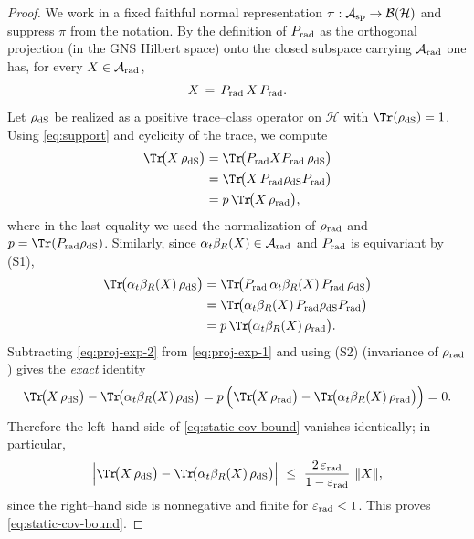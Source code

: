 \documentclass[10pt]{article}
\theoremstyle{definition}
\theoremstyle{plain}
\begin{document}
\begin{proof}
We work in a fixed faithful normal representation $\pi:\mathcal A_{\rm sp}\to\mathcal B(\mathcal H)$ and suppress $\pi$ from the notation.
By the definition of $P_{\rm rad}$ as the orthogonal projection (in the GNS Hilbert space) onto the closed subspace carrying
$\mathcal A_{\rm rad}$ one has, for every $X\in\mathcal A_{\rm rad}$,
\begin{equation}\label{eq:support}
X\,=\,P_{\rm rad}\,X\,P_{\rm rad}.
\end{equation}
Let $\rho_{\rm dS}$ be realized as a positive trace–class operator on $\mathcal H$ with $\Tr(\rho_{\rm dS})=1$.
Using \eqref{eq:support} and cyclicity of the trace, we compute
\begin{equation}
\label{eq:proj-exp-1}
\begin{aligned}
\Tr\!\big(X\,\rho_{\rm dS}\big)
&=\Tr\!\big(P_{\rm rad} X P_{\rm rad}\,\rho_{\rm dS}\big)\\
&=\Tr\!\big(X\,P_{\rm rad}\rho_{\rm dS}P_{\rm rad}\big)\\
&= p\,\Tr\!\big(X\,\rho_{\rm rad}\big),
\end{aligned}
\end{equation}
where in the last equality we used the normalization of $\rho_{\rm rad}$ and $p=\Tr(P_{\rm rad}\rho_{\rm dS})$.
Similarly, since $\alpha_t\beta_R(X)\in\mathcal A_{\rm rad}$ and $P_{\rm rad}$ is equivariant by (S1),
\begin{equation}
\label{eq:proj-exp-2}
\begin{aligned}
\Tr\!\big(\alpha_t\beta_R(X)\,\rho_{\rm dS}\big)
&=\Tr\!\big(P_{\rm rad}\,\alpha_t\beta_R(X)\,P_{\rm rad}\,\rho_{\rm dS}\big)\\
&=\Tr\!\big(\alpha_t\beta_R(X)\,P_{\rm rad}\rho_{\rm dS}P_{\rm rad}\big)\\
&= p\,\Tr\!\big(\alpha_t\beta_R(X)\,\rho_{\rm rad}\big).
\end{aligned}
\end{equation}
Subtracting \eqref{eq:proj-exp-2} from \eqref{eq:proj-exp-1} and using (S2) (invariance of $\rho_{\rm rad}$) gives the \emph{exact} identity
\begin{equation}\label{eq:exact-zero}
\Tr\!\big(X\,\rho_{\rm dS}\big) - \Tr\!\big(\alpha_t\beta_R(X)\,\rho_{\rm dS}\big)
= p\,\Big(\Tr\!\big(X\,\rho_{\rm rad}\big) - \Tr\!\big(\alpha_t\beta_R(X)\,\rho_{\rm rad}\big)\Big)
= 0.
\end{equation}
Therefore the left–hand side of \eqref{eq:static-cov-bound} vanishes identically; in particular,
\[
\Big|\Tr\!\big(X\,\rho_{\rm dS}\big) - \Tr\!\big(\alpha_t\beta_R(X)\,\rho_{\rm dS}\big)\Big|
\ \le\ \frac{2\,\varepsilon_{\rm rad}}{1-\varepsilon_{\rm rad}}\ \|X\|,
\]
since the right–hand side is nonnegative and finite for $\varepsilon_{\rm rad}<1$. This proves \eqref{eq:static-cov-bound}.


\end{proof}
\end{document}
